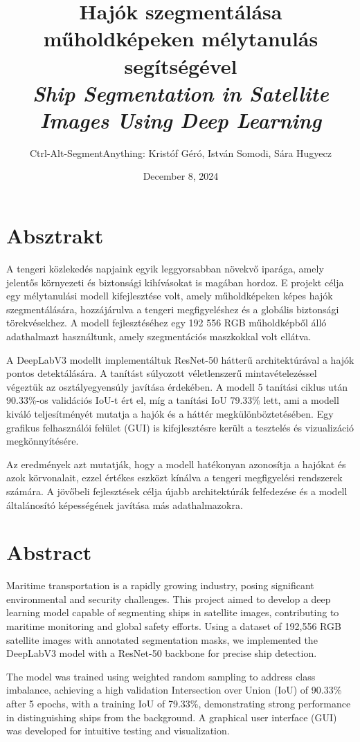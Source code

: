 \documentclass{article}
\title{Hajók szegmentálása műholdképeken mélytanulás segítségével \\
\textit{Ship Segmentation in Satellite Images Using Deep Learning}}
\author{Ctrl-Alt-SegmentAnything: Kristóf Géró, István Somodi, Sára Hugyecz}
\date{December 8, 2024}
\begin{document}
\maketitle

\section*{Absztrakt}

A tengeri közlekedés napjaink egyik leggyorsabban növekvő iparága, amely jelentős környezeti és biztonsági kihívásokat is magában hordoz. E projekt célja egy mélytanulási modell kifejlesztése volt, amely műholdképeken képes hajók szegmentálására, hozzájárulva a tengeri megfigyeléshez és a globális biztonsági törekvésekhez. A modell fejlesztéséhez egy 192 556 RGB műholdképből álló adathalmazt használtunk, amely szegmentációs maszkokkal volt ellátva. 

A DeepLabV3 modellt implementáltuk ResNet-50 hátterű architektúrával a hajók pontos detektálására. A tanítást súlyozott véletlenszerű mintavételezéssel végeztük az osztályegyensúly javítása érdekében. A modell 5 tanítási ciklus után 90.33\%-os validációs IoU-t ért el, míg a tanítási IoU 79.33\% lett, ami a modell kiváló teljesítményét mutatja a hajók és a háttér megkülönböztetésében. Egy grafikus felhasználói felület (GUI) is kifejlesztésre került a tesztelés és vizualizáció megkönnyítésére.

Az eredmények azt mutatják, hogy a modell hatékonyan azonosítja a hajókat és azok körvonalait, ezzel értékes eszközt kínálva a tengeri megfigyelési rendszerek számára. A jövőbeli fejlesztések célja újabb architektúrák felfedezése és a modell általánosító képességének javítása más adathalmazokra.

\section*{Abstract}

Maritime transportation is a rapidly growing industry, posing significant environmental and security challenges. This project aimed to develop a deep learning model capable of segmenting ships in satellite images, contributing to maritime monitoring and global safety efforts. Using a dataset of 192,556 RGB satellite images with annotated segmentation masks, we implemented the DeepLabV3 model with a ResNet-50 backbone for precise ship detection.

The model was trained using weighted random sampling to address class imbalance, achieving a high validation Intersection over Union (IoU) of 90.33\% after 5 epochs, with a training IoU of 79.33\%, demonstrating strong performance in distinguishing ships from the background. A graphical user interface (GUI) was developed for intuitive testing and visualization.
\end{document}
